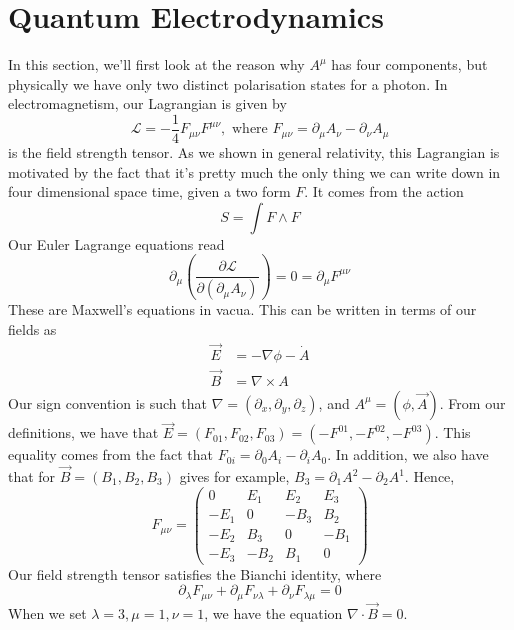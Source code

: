 \section{Quantum Electrodynamics}
In this section, we'll first look at the 
reason why $ A ^ \mu $ has four components, 
but physically we have only two distinct polarisation states 
for a photon. 
In electromagnetism, our Lagrangian is given by 
\[
 \mathcal{ L } = - \frac{1}{4 } F_{ \mu \nu } F ^{ \mu \nu }, \text{ where } F_{ \mu \nu }  = \partial  _ \mu A _ \nu - \partial  _ \nu A _ \mu 
\]  is the field strength tensor. As we shown 
in general relativity, this Lagrangian is 
motivated by the fact that it's 
pretty much the only thing we can write down 
in four dimensional space time, given a 
two form $ F $. It comes 
from the action 
\[
 S = \int F \wedge  F 
\]  
Our Euler Lagrange equations read 
\[
	\partial  _ \mu \left( \frac{\partial  \mathcal{ L } }{\partial  ( \partial  _ \mu A _ \nu )  }   \right) =0  = \partial  _ \mu F ^{ \mu \nu } 
\] These are Maxwell's equations in vacua. 
This can be written in terms of our fields as 
\begin{align*}
	\vec{E} &=  - \nabla \phi  - \dot{ A }   \\ 
	\vec{B} &= \nabla \times A 
\end{align*}
Our sign convention is such that 
$ \nabla  = \left( \partial  _ x , \partial  _ y , \partial  _ z  \right) $, 
and $ A ^ \mu = \left( \phi , \vec{A} \right) $. 
From our definitions, we have that $ \vec{E} = \left( F_{ 01}, F _{ 02 },  F_{ 03} \right) 
 = \left(  - F ^{ 01 } , -  F^{ 02 } , - F ^{ 0 3}  \right)  $. 
 This equality comes from the fact that $ F _{ 0 i} = \partial  _ 0 A _ i - \partial  _ i A _ 0   $. 
 In addition, we also have that 
 for $ \vec{B} = \left( B _ 1 , B_2, B_3  \right)  $ gives 
 for example, $B _ 3 = \partial  _ 1 A ^ 2  - \partial  _ 2 A ^1 $. 
 Hence, 
 \[
	 F _{ \mu \nu  }  = \begin{pmatrix}  0 & E _ 1 & E_2 & E_3 \\ 
		 - E _  1 & 0 & - B _ 3 & B _ 2 \\ - E_ 2 & B _ 3 & 0 & - B _ 1 \\
		 - E _ 3 & - B _ 2 & B _ 1 & 0 
 \end{pmatrix}
 \]  
 Our field strength tensor satisfies the Bianchi identity, where 
 \[
  \partial  _ \lambda F _{ \mu \nu } + \partial  _ \mu F _{ \nu \lambda } + \partial  _ \nu F _{ \lambda \mu }  =0 
 \]  When we set $ \lambda = 3 , \mu = 1, \nu = 1 $, 
 we have the equation $ \nabla \cdot  \vec{B} = 0 $. 
